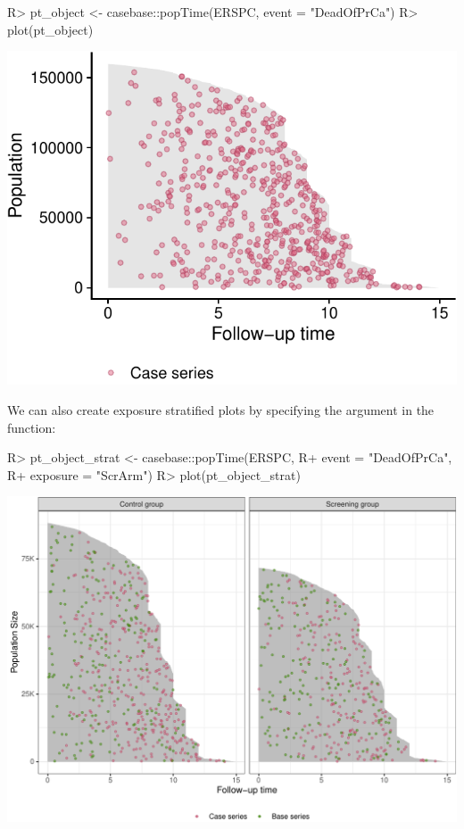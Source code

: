 \documentclass[
]{jss}
\begin{document}
\begin{CodeChunk}

\begin{CodeInput}
R> pt_object <- casebase::popTime(ERSPC, event = "DeadOfPrCa")
R> plot(pt_object)
\end{CodeInput}


\begin{center}\includegraphics{../figures/plot-erspc-data-1} \end{center}

\end{CodeChunk}

We can also create exposure stratified plots by specifying the
 argument in the  function:

\begin{CodeChunk}

\begin{CodeInput}
R> pt_object_strat <- casebase::popTime(ERSPC, 
R+                                      event = "DeadOfPrCa", 
R+                                      exposure = "ScrArm")
R> plot(pt_object_strat)
\end{CodeInput}


\begin{center}\includegraphics{../figures/plot-stratified-erspc-data-1} \end{center}

\end{CodeChunk}
\end{document}
